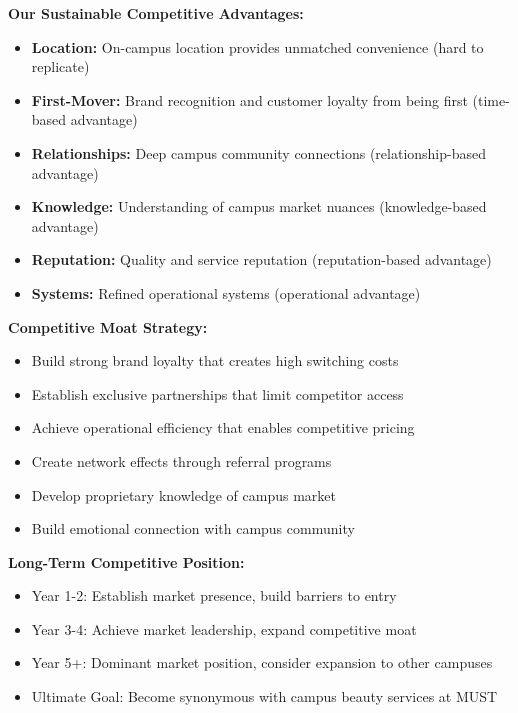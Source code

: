 \begin{tcolorbox}[mybox, title=\textbf{Competitive Advantage Sustainability}]
\textbf{Our Sustainable Competitive Advantages:}
\begin{itemize}[leftmargin=1em, itemsep=0pt]
    \item \textbf{Location:} On-campus location provides unmatched convenience (hard to replicate)
    \item \textbf{First-Mover:} Brand recognition and customer loyalty from being first (time-based advantage)
    \item \textbf{Relationships:} Deep campus community connections (relationship-based advantage)
    \item \textbf{Knowledge:} Understanding of campus market nuances (knowledge-based advantage)
    \item \textbf{Reputation:} Quality and service reputation (reputation-based advantage)
    \item \textbf{Systems:} Refined operational systems (operational advantage)
\end{itemize}

\textbf{Competitive Moat Strategy:}
\begin{itemize}[leftmargin=1em, itemsep=0pt]
    \item Build strong brand loyalty that creates high switching costs
    \item Establish exclusive partnerships that limit competitor access
    \item Achieve operational efficiency that enables competitive pricing
    \item Create network effects through referral programs
    \item Develop proprietary knowledge of campus market
    \item Build emotional connection with campus community
\end{itemize}

\textbf{Long-Term Competitive Position:}
\begin{itemize}[leftmargin=1em, itemsep=0pt]
    \item Year 1-2: Establish market presence, build barriers to entry
    \item Year 3-4: Achieve market leadership, expand competitive moat
    \item Year 5+: Dominant market position, consider expansion to other campuses
    \item Ultimate Goal: Become synonymous with campus beauty services at MUST
\end{itemize}
\end{tcolorbox}

